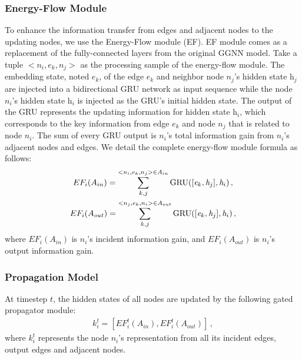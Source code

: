\documentclass[letterpaper]{article} %
\begin{document}
\subsubsection{Energy-Flow Module}
To enhance the information transfer from edges and adjacent nodes to the updating nodes, we use the Energy-Flow module (EF).
EF module comes as a replacement of the fully-connected layers from the original GGNN model. 
Take a tuple $<{n}_i, {e}_k, {n}_j>$ as the processing sample of the energy-flow module. 
The embedding state, noted $\textit{e}_k$, of the edge ${e}_k$ and neighbor node ${n}_j$'s hidden state $\textit{h}_j$ are injected into a bidirectional GRU network as input sequence while the node ${n}_i$'s hidden state $\textit{h}_i$ is injected as the GRU's initial hidden state. 
The output of the GRU represents the updating information for hidden state $\textit{h}_i$, which corresponds to the key information from edge ${e}_k$ and node ${n}_j$ that is related to node ${n}_i$. 
The sum of every GRU output is ${n}_i$'s total information gain from ${n}_i$'s adjacent nodes and edges. 
We detail the complete energy-flow module formula as follows:
\begin{gather}\notag
    EF_i(A_{in}) = \sum\limits_{k,j}^{<n_i,e_k,n_j>\in A_{in}} \text{GRU}([\textit{e}_k, \textit{h}_j], \textit{h}_i) \, , \\ \notag
    EF_i(A_{out}) = \sum\limits_{k,j}^{<{n}_j,{e}_k,{n}_i>\in A_{out}} \text{GRU}([\textit{e}_k, \textit{h}_j], \textit{h}_i) \, ,\notag
\end{gather}
where $EF_i(A_{in})$ is ${n}_i$'s incident information gain, and $EF_i(A_{out})$ is ${n}_i$'s output information gain.


\medskip
\subsubsection{Propagation Model}

At timestep $t$, the hidden states of all nodes are updated by the following gated propagator module:
\begin{gather}
    k_{i}^t = [EF_i^t(A_{in}), EF_i^t(A_{out})] \, ,
\end{gather}
where $k_{i}^t$ represents the node ${n}_i$'s representation from all its incident edges, output edges and adjacent nodes.
\end{document}
